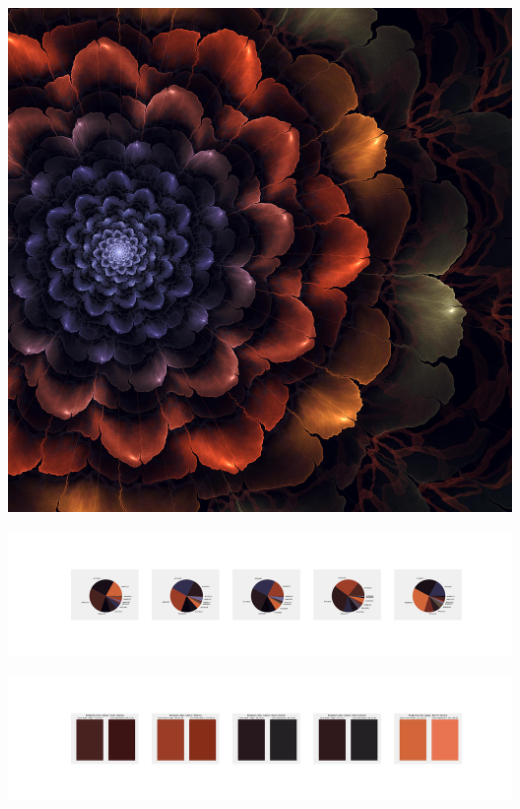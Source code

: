 \documentclass[11pt]{article}
\begin{document}
\begin{landscape}
    \begin{center}
    \includegraphics[width=\textwidth]{./nbimg/file (223).jpg}
    \end{center}

    \begin{center}
    \includegraphics[width=250mm]{./nbimg/pie-138.jpg}
    \end{center}

    \begin{center}
    \includegraphics[width=250mm]{./nbimg/peak-138.jpg}
    \end{center}
    


\end{landscape}
\end{document}
